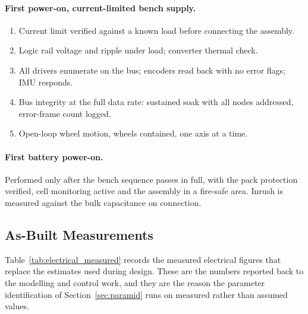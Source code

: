 \paragraph{First power-on, current-limited bench supply.}
\begin{enumerate}
  \item Current limit verified against a known load before connecting the
        assembly.
  \item Logic rail voltage and ripple under load; converter thermal check.
  \item All drivers enumerate on the bus; encoders read back with no error
        flags; IMU responds.
  \item Bus integrity at the full data rate: sustained soak with all nodes
        addressed, error-frame count logged.
  \item Open-loop wheel motion, wheels contained, one axis at a time.
\end{enumerate}

\paragraph{First battery power-on.} Performed only after the bench sequence
passes in full, with the pack protection verified, cell monitoring active and
the assembly in a fire-safe area. Inrush is measured against the bulk
capacitance on connection.

\subsection{As-Built Measurements}
\label{app:electrical_measured}

Table~\ref{tab:electrical_measured} records the measured electrical figures that
replace the estimates used during design. These are the numbers reported back to
the modelling and control work, and they are the reason the parameter
identification of Section~\ref{sec:paramid} runs on measured rather than assumed
values.

